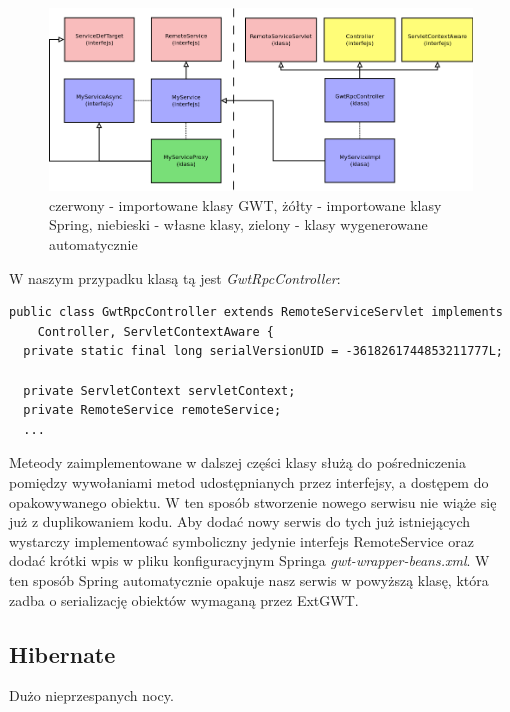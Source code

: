 \documentclass[licencjacka]{pracamgr}
\begin{document}
\begin{figure}[h!]
\centering
\includegraphics[width=\textwidth]{resources/gwt_spring_2.png}
\caption{czerwony - importowane klasy GWT, żółty - importowane klasy Spring, niebieski - własne klasy, zielony - klasy wygenerowane automatycznie}
\end{figure}

W naszym przypadku klasą tą jest \textit{GwtRpcController}: 
\begin{verbatim}
public class GwtRpcController extends RemoteServiceServlet implements
    Controller, ServletContextAware {
  private static final long serialVersionUID = -3618261744853211777L;
          
  private ServletContext servletContext;
  private RemoteService remoteService;
  ...
\end{verbatim}
Meteody zaimplementowane w dalszej części klasy służą do pośredniczenia pomiędzy wywołaniami metod udostępnianych przez interfejsy, a dostępem do opakowywanego obiektu. W ten sposób stworzenie nowego serwisu nie wiąże się już z duplikowaniem kodu. Aby dodać nowy serwis do tych już istniejących wystarczy implementować symboliczny jedynie interfejs RemoteService oraz dodać krótki wpis w pliku konfiguracyjnym Springa \textit{gwt-wrapper-beans.xml}. W ten sposób Spring automatycznie opakuje nasz serwis w powyższą klasę, która zadba o serializację obiektów wymaganą przez ExtGWT. 

\subsection{Hibernate}
Dużo nieprzespanych nocy.
\end{document}
